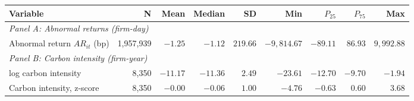 \begin{tabular}{lrrrrrrrr}
\toprule
Variable & N & Mean & Median & SD & Min & $P_{25}$ & $P_{75}$ & Max \\
\midrule
\multicolumn{9}{l}{\textit{Panel A: Abnormal returns (firm-day)}} \\
Abnormal return $AR_{it}$ (bp) & 1,957,939 & $-1.25$ & $-1.12$ & $219.66$ & $-9,814.67$ & $-89.11$ & $86.93$ & $9,992.88$ \\
\multicolumn{9}{l}{\textit{Panel B: Carbon intensity (firm-year)}} \\
log carbon intensity & 8,350 & $-11.17$ & $-11.36$ & $2.49$ & $-23.61$ & $-12.70$ & $-9.70$ & $-1.94$ \\
Carbon intensity, z-score & 8,350 & $-0.00$ & $-0.06$ & $1.00$ & $-4.76$ & $-0.63$ & $0.60$ & $3.68$ \\
\bottomrule
\end{tabular}
